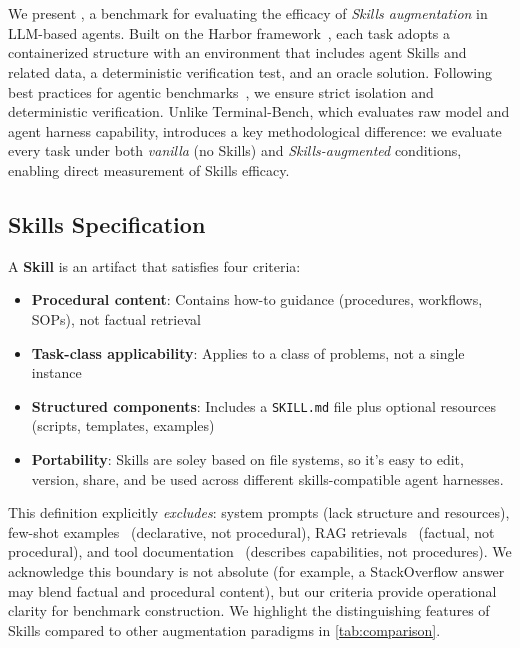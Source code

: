 \section{\benchmarkName{}}
\label{sec:SkillsBench}

We present \benchmarkName{}, a benchmark for evaluating the efficacy of \emph{Skills augmentation} in LLM-based agents. Built on the Harbor framework~\citep{merrill2026terminalbenchbenchmarkingagentshard, harborframeworkteam2026harborframework}, each task adopts a containerized structure with an environment that includes agent Skills and related data, a deterministic verification test, and an oracle solution. Following best practices for agentic benchmarks~\citep{zhu2025bestpractices, anthropic2026demystifying}, we ensure strict isolation and deterministic verification. Unlike Terminal-Bench, which evaluates raw model and agent harness capability, \benchmarkName{} introduces a key methodological difference: we evaluate every task under both \emph{vanilla} (no Skills) and \emph{Skills-augmented} conditions, enabling direct measurement of Skills efficacy.

\subsection{Skills Specification}
\label{sec:skill_spec}

A \textbf{Skill} is an artifact that satisfies four criteria:
\begin{itemize}[nosep,leftmargin=*]
    \item \textbf{Procedural content}: Contains how-to guidance (procedures, workflows, SOPs), not factual retrieval
    \item \textbf{Task-class applicability}: Applies to a class of problems, not a single instance
    \item \textbf{Structured components}: Includes a \texttt{SKILL.md} file plus optional resources (scripts, templates, examples)
    \item \textbf{Portability}: Skills are soley based on file systems, so it's easy to edit, version, share, and be used across different skills-compatible agent harnesses. 
\end{itemize}

\noindent This definition explicitly \emph{excludes}: system prompts (lack structure and resources), few-shot examples~\citep{brown2020languagemodelsfewshotlearners} (declarative, not procedural), RAG retrievals~\citep{lewis2021retrievalaugmentedgenerationknowledgeintensivenlp} (factual, not procedural), and tool documentation~\citep{schick2023toolformerlanguagemodelsteach, qin2024toolllm} (describes capabilities, not procedures).
We acknowledge this boundary is not absolute
(for example, a StackOverflow answer may blend factual and procedural content),
but our criteria provide operational clarity for benchmark construction.
We highlight the distinguishing features of Skills compared to other augmentation paradigms in \autoref{tab:comparison}.


